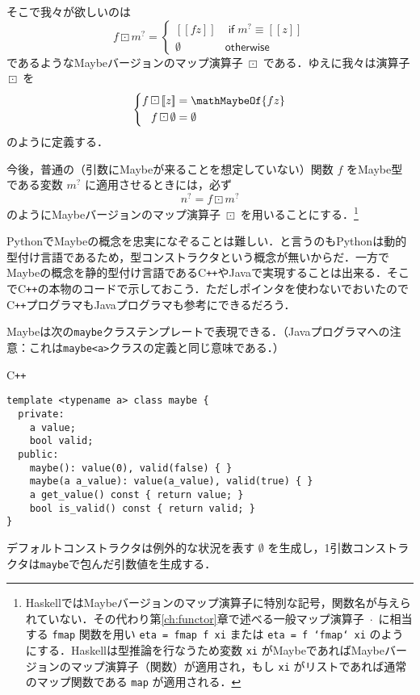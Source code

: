 \documentclass[a4paper,draft]{jsbook}
\def\[{\left[\!\left[}
\def\]{\right]\!\right]}
\newcommand{\programminglanguage}[1]{\textsf{#1}}
\newcommand{\cxx}{\programminglanguage{C}\texttt{++}}
\newcommand{\haskell}{\programminglanguage{Haskell}}
\newcommand{\java}{\programminglanguage{Java}}
\newcommand{\python}{\programminglanguage{Python}}
\newcommand{\code}[1]{\texttt{#1}}
\newenvironment{cxxcode}{\begin{itembox}[r]{\cxx}}{\end{itembox}}
\newcommand{\mNothing}{\emptyset}
\newcommand{\mKeyword}[1]{\mathsf{#1}}
\newcommand{\mIfKeyword}{\mKeyword{if}}
\newcommand{\mOtherwiseKeyword}{\mKeyword{otherwise}}
\newcommand{\mMaybeWith}[1]{\[#1\]}
\newcommand{\mMaybe}[1]{{#1}^\text{?}}
\DeclareMathOperator{\mMap}{\cdot}
\DeclareMathOperator{\mMapMaybe}{\boxdot}
\DeclareMathOperator{\mIf}{\mIfKeyword}
\DeclareMathOperator{\mOtherwise}{\mOtherwiseKeyword}
\begin{document}
そこで我々が欲しいのは
\begin{equation}
f\mMapMaybe\mMaybe{m}=\begin{cases}
\mMaybeWith{fz}&\mIf\mMaybe{m}\equiv\mMaybeWith{z}\\
\mNothing&\mOtherwise
\end{cases}
\end{equation}
であるようなMaybeバージョンのマップ演算子 $\mMapMaybe$ である．ゆえに我々は演算子 $\mMapMaybe$ を
\begin{equation}
\left\{
\begin{split}
f\mMapMaybe\mMaybeWith{z}&=\mathMaybeOf{fz}\\
f\mMapMaybe\mNothing&=\mNothing
\end{split}
\right.
\end{equation}
のように定義する．

今後，普通の（引数にMaybeが来ることを想定していない）関数 $f$ をMaybe型である変数 $\mMaybe{m}$ に適用させるときには，必ず
\begin{equation}
\mMaybe{n}=f\mMapMaybe\mMaybe{m}
\end{equation}
のようにMaybeバージョンのマップ演算子 $\mMapMaybe$ を用いることにする．\footnote{\haskell ではMaybeバージョンのマップ演算子に特別な記号，関数名が与えられていない．その代わり第\ref{ch:functor}章で述べる一般マップ演算子 $\mMap$ に相当する \code{fmap} 関数を用い \code{eta = fmap f xi} または \code{eta = f `fmap` xi} のようにする．\haskell は型推論を行なうため変数 \code{xi} がMaybeであればMaybeバージョンのマップ演算子（関数）が適用され，もし \code{xi} がリストであれば通常のマップ関数である \code{map} が適用される．}

\python でMaybeの概念を忠実になぞることは難しい．と言うのも\python は動的型付け言語であるため，型コンストラクタという概念が無いからだ．一方でMaybeの概念を静的型付け言語である\cxx や\java で実現することは出来る．そこで\cxx の本物のコードで示しておこう．ただしポインタを使わないでおいたので\cxx プログラマも\java プログラマも参考にできるだろう．

Maybeは次の\code{maybe}クラステンプレートで表現できる．（\java プログラマへの注意：これは\code{maybe<a>}クラスの定義と同じ意味である．）
\begin{cxxcode}
\begin{verbatim}
template <typename a> class maybe {
  private:
    a value;
    bool valid;
  public:
    maybe(): value(0), valid(false) { }
    maybe(a a_value): value(a_value), valid(true) { }
    a get_value() const { return value; }
    bool is_valid() const { return valid; }
}
\end{verbatim}
\end{cxxcode}
デフォルトコンストラクタは例外的な状況を表す $\mNothing$ を生成し，1引数コンストラクタは\code{maybe}で包んだ引数値を生成する．
\end{document}
